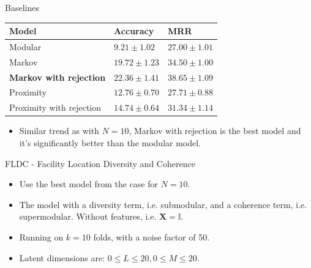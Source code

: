 \documentclass{beamer}
\begin{document}
\begin{frame}{Baselines}
  \begin{table}
    \centering
    \begin{tabular}{@{}lll@{}}
      \hline
      \textbf{Model} & \textbf{Accuracy} & \textbf{MRR} \\
      \hline
      Modular & $9.21 \pm 1.02$ & $27.00 \pm 1.01$ \\
      Markov & $19.72 \pm 1.23$ & $34.50 \pm 1.00$ \\
      \textbf{Markov with rejection} & $\mathbf{22.36 \pm 1.41}$ & $\mathbf{38.65 \pm 1.09}$ \\
      Proximity & $12.76 \pm 0.70$ & $27.71 \pm 0.88$ \\
      Proximity with rejection & $14.74 \pm 0.64$ & $31.34 \pm 1.14$ \\
      \hline
    \end{tabular}
  \end{table}
  \begin{itemize}
    \item Similar trend as with $N = 10$, Markov with rejection is the best model and it's significantly better than the modular model.
  \end{itemize}
\end{frame}

\begin{frame}{FLDC - Facility Location Diversity and Coherence}
  \begin{itemize}
    \item Use the best model from the case for $N = 10$.
    \item The model with a diversity term, i.e. submodular, and a coherence term, i.e. supermodular. Without features, i.e. $\mathbf{X} = \mathbb{I}$.
    \item Running on $k = 10$ folds, with a noise factor of 50.
    \item Latent dimensions are: $0 \leq L \leq 20, 0 \leq M \leq 20$.
  \end{itemize}
\end{frame}
\end{document}
